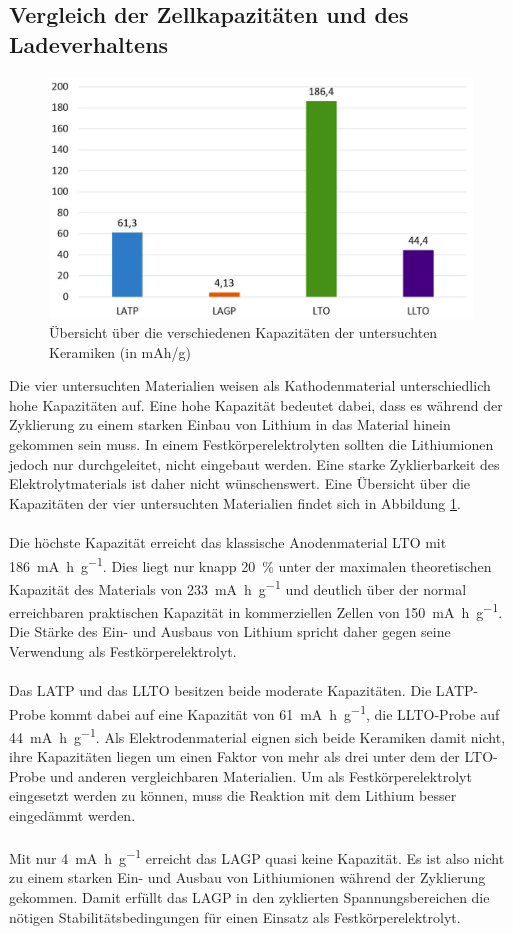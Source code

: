 \documentclass[a4paper, 11pt, headsepline,footsepline,twoside,abstract]{scrbook}
\begin{document}
\subsection{Vergleich der Zellkapazitäten und des Ladeverhaltens}
\begin{figure}
	\centering
	\includegraphics[width=1.00\columnwidth]{images/kapazitaeten.jpg}
	\caption{Übersicht über die verschiedenen Kapazitäten der untersuchten Keramiken (in mAh/g)}
	\label{kapazitaeten}
\end{figure}
Die vier untersuchten Materialien weisen als Kathodenmaterial unterschiedlich hohe Kapazitäten auf. Eine hohe Kapazität bedeutet dabei, dass es während der Zyklierung zu einem starken Einbau von Lithium in das Material hinein gekommen sein muss. In einem Festkörperelektrolyten sollten die Lithiumionen jedoch nur durchgeleitet, nicht eingebaut werden. Eine starke Zyklierbarkeit des Elektrolytmaterials ist daher nicht wünschenswert. Eine Übersicht über die Kapazitäten der vier untersuchten Materialien findet sich in Abbildung \ref{kapazitaeten}.
\\\\
Die höchste Kapazität erreicht das klassische Anodenmaterial LTO mit \SI{186}{\milli\ampere\hour\per\gram}. Dies liegt nur knapp \SI{20}{\percent} unter der maximalen theoretischen Kapazität des Materials von \SI{233}{\milli\ampere\hour\per\gram} und deutlich über der normal erreichbaren praktischen Kapazität in kommerziellen Zellen von \SI{150}{\milli\ampere\hour\per\gram}. Die Stärke des Ein- und Ausbaus von Lithium spricht daher gegen seine Verwendung als Festkörperelektrolyt.
\\\\
Das LATP und das LLTO besitzen beide moderate Kapazitäten. Die LATP-Probe kommt dabei auf eine Kapazität von \SI{61}{\milli\ampere\hour\per\gram}, die LLTO-Probe auf \SI{44}{\milli\ampere\hour\per\gram}. Als Elektrodenmaterial eignen sich beide Keramiken damit nicht, ihre Kapazitäten liegen um einen Faktor von mehr als drei unter dem der LTO-Probe und anderen vergleichbaren Materialien. Um als Festkörperelektrolyt eingesetzt werden zu können, muss die Reaktion mit dem Lithium besser eingedämmt werden. 
\\\\
Mit nur \SI{4}{\milli\ampere\hour\per\gram} erreicht das LAGP quasi keine Kapazität. Es ist also nicht zu einem starken Ein- und Ausbau von Lithiumionen während der Zyklierung gekommen. Damit erfüllt das LAGP in den zyklierten Spannungsbereichen die nötigen Stabilitätsbedingungen für einen Einsatz als Festkörperelektrolyt.
\end{document}
